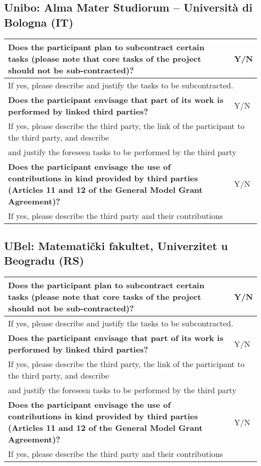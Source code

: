 \subsection{Unibo: Alma Mater Studiorum – Università di Bologna (IT)}

\begin{longtable}{|p{}|p{}|}
\hline
{\bf Does the participant plan to subcontract certain tasks (please
  note that core tasks of the project should not be sub-contracted)?}
&
Y/N
\\
\hline
\multicolumn{2}{|l|}{
If yes, please describe and justify the tasks to be subcontracted.}
\\
\hline
{\bf Does the participant envisage that  part of its work is performed
  by linked third parties?}
&
Y/N
\\
\hline
\multicolumn{2}{|l|}{If yes, please describe the third party, the link of the
  participant to the third party, and describe}\\
\multicolumn{2}{|l|}{and justify the foreseen
tasks to be performed by the third party}
\\
\hline
{\bf Does the participant envisage the use of contributions in kind
provided by third parties (Articles 11 and 12 of the General Model
Grant Agreement)?}
&
Y/N
\\
\hline
\multicolumn{2}{|l|}{If yes, please describe the third party and their contributions}
\\
\hline
\end{longtable}

\subsection{UBel: Matematički fakultet, Univerzitet u Beogradu (RS)}

\begin{longtable}{|p{}|p{}|}
\hline
{\bf Does the participant plan to subcontract certain tasks (please
  note that core tasks of the project should not be sub-contracted)?}
&
Y/N
\\
\hline
\multicolumn{2}{|l|}{
If yes, please describe and justify the tasks to be subcontracted.}
\\
\hline
{\bf Does the participant envisage that  part of its work is performed
  by linked third parties?}
&
Y/N
\\
\hline
\multicolumn{2}{|l|}{If yes, please describe the third party, the link of the
  participant to the third party, and describe}\\
\multicolumn{2}{|l|}{and justify the foreseen
tasks to be performed by the third party}
\\
\hline
{\bf Does the participant envisage the use of contributions in kind
provided by third parties (Articles 11 and 12 of the General Model
Grant Agreement)?}
&
Y/N
\\
\hline
\multicolumn{2}{|l|}{If yes, please describe the third party and their contributions}
\\
\hline
\end{longtable}


